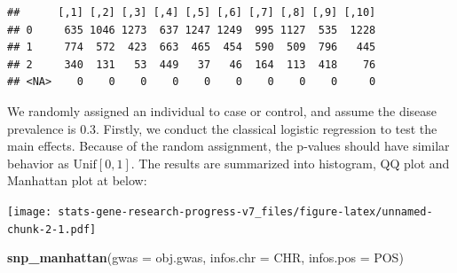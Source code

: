 \documentclass[
]{article}
\newenvironment{Shaded}{\begin{snugshade}}{\end{snugshade}}
\newcommand{\CommentTok}[1]{\textcolor[rgb]{0.56,0.35,0.01}{\textit{#1}}}
\newcommand{\DataTypeTok}[1]{\textcolor[rgb]{0.13,0.29,0.53}{#1}}
\newcommand{\DecValTok}[1]{\textcolor[rgb]{0.00,0.00,0.81}{#1}}
\newcommand{\FloatTok}[1]{\textcolor[rgb]{0.00,0.00,0.81}{#1}}
\newcommand{\KeywordTok}[1]{\textcolor[rgb]{0.13,0.29,0.53}{\textbf{#1}}}
\newcommand{\NormalTok}[1]{#1}
\newcommand{\OperatorTok}[1]{\textcolor[rgb]{0.81,0.36,0.00}{\textbf{#1}}}
\newcommand{\StringTok}[1]{\textcolor[rgb]{0.31,0.60,0.02}{#1}}
\begin{document}
\begin{verbatim}
##      [,1] [,2] [,3] [,4] [,5] [,6] [,7] [,8] [,9] [,10]
## 0     635 1046 1273  637 1247 1249  995 1127  535  1228
## 1     774  572  423  663  465  454  590  509  796   445
## 2     340  131   53  449   37   46  164  113  418    76
## <NA>    0    0    0    0    0    0    0    0    0     0
\end{verbatim}

We randomly assigned an individual to case or control, and assume the
disease prevalence is 0.3. Firstly, we conduct the classical logistic
regression to test the main effects. Because of the random assignment,
the p-values should have similar behavior as \(\text{Unif}[0,1]\). The
results are summarized into histogram, QQ plot and Manhattan plot at
below:

\begin{Shaded}
\end{Shaded}

\texttt{[image: stats-gene-research-progress-v7\_files/figure-latex/unnamed-chunk-2-1.pdf]}

\begin{Shaded}
\begin{Highlighting}[]
\KeywordTok{snp_manhattan}\NormalTok{(}\DataTypeTok{gwas =}\NormalTok{ obj.gwas, }\DataTypeTok{infos.chr =}\NormalTok{ CHR, }\DataTypeTok{infos.pos =}\NormalTok{ POS)}
\end{Highlighting}
\end{Shaded}
\end{document}
